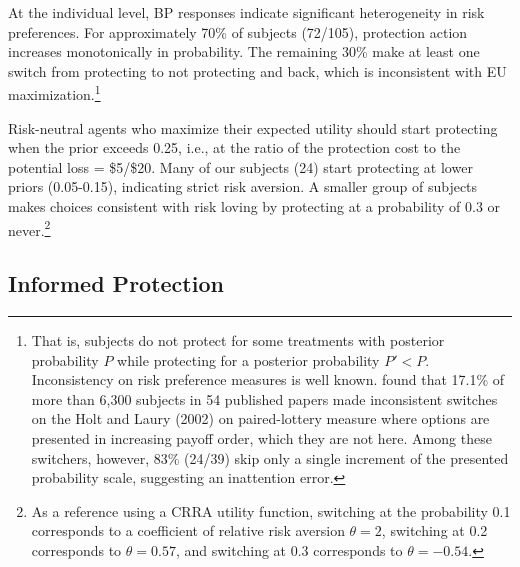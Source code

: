\documentclass[12pt,a4paper]{article}
\begin{document}
At the individual level, BP responses indicate significant heterogeneity in risk preferences. For approximately 70\% of subjects (72/105), protection action increases monotonically in probability. The remaining 30\% make at least one switch from protecting to not protecting and back, which is inconsistent with EU maximization.\footnote{That is, subjects do not protect for some treatments with posterior probability $P$ while protecting for a posterior probability $P'<P$.  Inconsistency on risk preference measures is well known.  \citet{filippin_reconsideration_2016} found that 17.1\% of more than 6,300 subjects in 54 published papers made inconsistent switches on the Holt and Laury (2002) on paired-lottery measure where options are presented in increasing payoff order, which they are not here. Among these switchers, however, 83\% (24/39) skip only a single increment of the presented probability scale, suggesting an inattention error.}


Risk-neutral agents who maximize their expected utility should start protecting when the prior exceeds 0.25, i.e., at the ratio of the protection cost to the potential loss = \$5/\$20. Many of our subjects (24) start protecting at lower priors (0.05-0.15), indicating strict risk aversion.  A smaller group of subjects makes choices consistent with risk loving by protecting at a probability of 0.3 or never.\footnote{As a reference using a CRRA utility function, switching at the probability 0.1 corresponds to a coefficient of relative risk aversion $\theta=2$, switching at 0.2 corresponds to $\theta=0.57$, and switching at 0.3 corresponds to $\theta=-0.54$.} 


\subsection{Informed Protection}
\end{document}
